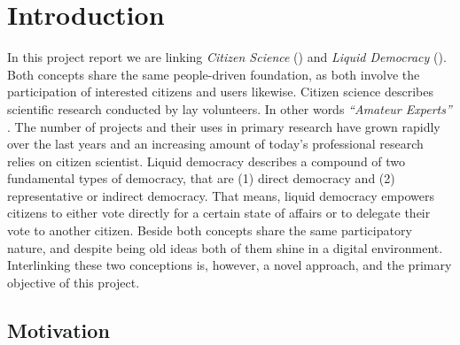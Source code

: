 \chapter{Introduction}
\label{ch:Introduction}


In this project report we are linking \textit{Citizen Science} () and \textit{Liquid Democracy} (). Both concepts share the same people-driven foundation, as both involve the participation of interested citizens and users likewise. Citizen science describes scientific research conducted by lay volunteers. In other words \textit{“Amateur Experts”}  \parencite{Gura2013}. The number of  projects and their uses in primary research have grown rapidly over the last years \parencite{Kosmala2016} and an increasing amount of today’s professional research relies on citizen scientist. Liquid democracy describes a compound of two fundamental types of democracy, that are (1) direct democracy and (2) representative or indirect democracy. That means, liquid democracy empowers citizens to either vote directly for a certain state of affairs or to  delegate their vote to another citizen. Beside both concepts share the same participatory nature, and despite being old ideas both of them shine in a digital environment. Interlinking these two conceptions is, however, a novel approach, and the primary objective of this project.


\section{Motivation}
\label{sec:Motivation}

